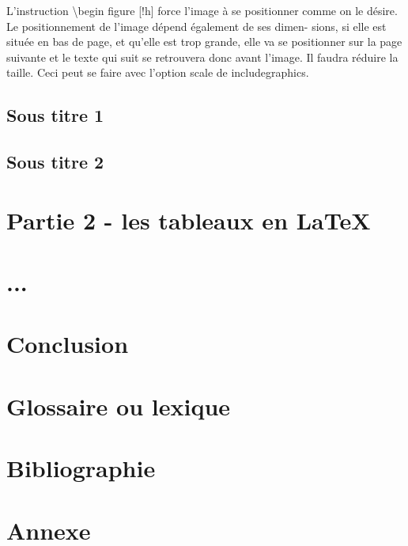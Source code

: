 \documentclass[10pt]{article}
\begin{document}
L’instruction \textbackslash begin figure [!h] force l’image à se positionner comme
on le désire. Le positionnement de l’image dépend également de ses dimen-
sions, si elle est située en bas de page, et qu’elle est trop grande, elle va se
positionner sur la page suivante et le texte qui suit se retrouvera donc avant
l’image. Il faudra réduire la taille. Ceci peut se faire avec l’option scale de
includegraphics.

\subsection{Sous titre 1}
\subsection{Sous titre 2}

\section{Partie 2 - les tableaux en LaTeX}

\section{...}

\section{Conclusion}

\section{Glossaire ou lexique}

\section{Bibliographie}

\section{Annexe}
\end{document}
